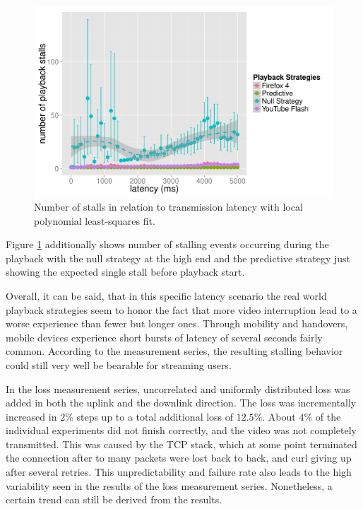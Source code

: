 \begin{figure}[htb]
    \centering
    \includegraphics[width=\textwidth]{images/R-playbackemulation-stallnumber-latency.pdf}
    \caption{Number of stalls in relation to transmission latency with local polynomial least-squares fit.}
    \label{c3:fig:eval-latency-numstalls}
\end{figure}

Figure \ref{c3:fig:eval-latency-numstalls} additionally shows number of stalling events occurring during the playback with the null strategy at the high end and the predictive strategy just showing the expected single stall before playback start. %

Overall, it can be said, that in this specific latency scenario the real world playback strategies seem to honor the fact that more video interruption lead to a worse experience than fewer but longer ones.  Through mobility and handovers, mobile devices experience short bursts of latency of several seconds fairly common. According to the measurement series, the resulting stalling behavior could still very well be bearable for streaming users.

In the loss measurement series, uncorrelated and uniformly distributed loss was added in both the uplink and the downlink direction. The loss was incrementally increased in $2\%$ steps up to a total additional loss of $12.5\%$. About $4\%$ of the individual experiments did not finish correctly, and the video was not completely transmitted. This was caused by the \gls{TCP} stack, which at some point terminated the connection after to many packets were lost back to back, and curl giving up after several retries. This unpredictability and failure rate also leads to the high variability seen in the results of the loss measurement series. Nonetheless, a certain trend can still be derived from the results.


